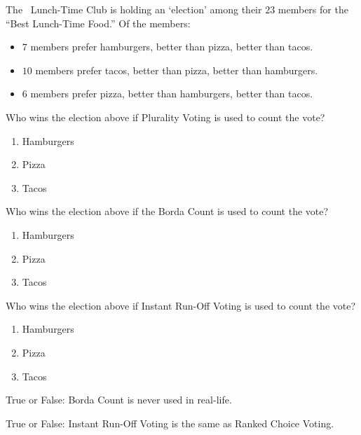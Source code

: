\documentclass[nooutcomes,noauthor]{ximera}
\author{Bart Snapp}
\begin{document}
\maketitle

The \mooculus~Lunch-Time Club is holding an `election' among their
$23$ members for the ``Best Lunch-Time Food.'' Of the members:
\begin{itemize}
\item $7$ members prefer hamburgers, better than pizza, better than tacos. 
\item $10$ members prefer tacos, better than pizza, better than hamburgers. 
\item $6$ members prefer pizza, better than hamburgers, better than tacos.
\end{itemize}

 


\begin{exercise}
  Who wins the election above if Plurality Voting is used to count the
  vote?
  \begin{multicols}{3}
  \begin{enumerate}
  \item Hamburgers
  \item Pizza
  \item Tacos
  \end{enumerate}
  \end{multicols}
\end{exercise}



\begin{exercise}
  Who wins the election above if the Borda Count is used to count the
  vote?
  \begin{multicols}{3}
  \begin{enumerate}
  \item Hamburgers
  \item Pizza
  \item Tacos
  \end{enumerate}
  \end{multicols}
\end{exercise}



\begin{exercise}
  Who wins the election above if Instant Run-Off Voting is used to
  count the vote?
  \begin{multicols}{3}
  \begin{enumerate}
  \item Hamburgers
  \item Pizza
  \item Tacos
  \end{enumerate}
  \end{multicols}
\end{exercise}



\begin{exercise}
  True or False: Borda Count is never used in real-life.
\end{exercise}



\begin{exercise}
  True or False: Instant Run-Off Voting is the same as Ranked Choice Voting.
\end{exercise}


\end{document}
